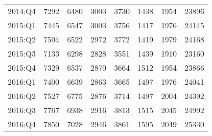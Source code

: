 \begin{footnotesize}
\begin{center}
\begin{longtable}{rrrrrrrr}
    2014:Q4 & 7292  & 6480  & 3003  & 3730  & 1438  & 1954  & 23896  \\
    2015:Q1 & 7445  & 6547  & 3003  & 3756  & 1417  & 1976  & 24145  \\
    2015:Q2 & 7504  & 6522  & 2972  & 3772  & 1419  & 1979  & 24168  \\
    2015:Q3 & 7133  & 6298  & 2828  & 3551  & 1439  & 1910  & 23160  \\
    2015:Q4 & 7329  & 6537  & 2870  & 3664  & 1512  & 1954  & 23866  \\
    2016:Q1 & 7400  & 6639  & 2863  & 3665  & 1497  & 1976  & 24041  \\
    2016:Q2 & 7527  & 6775  & 2876  & 3714  & 1497  & 2004  & 24392  \\
    2016:Q3 & 7767  & 6938  & 2916  & 3813  & 1515  & 2045  & 24992  \\
    2016:Q4 & 7850  & 7028  & 2946  & 3861  & 1595  & 2049  & 25330  \\
\end{longtable}
\end{center}
\end{footnotesize} 